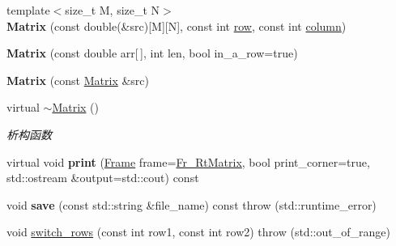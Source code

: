 \begin{DoxyCompactItemize}
\item 
\mbox{\label{classkerbal_1_1math_1_1_matrix_a39f2605c9bd2a647f6f8a7b9dfff804a}} 
{\footnotesize template$<$size\+\_\+t M, size\+\_\+t N$>$ }\\{\bfseries Matrix} (const double(\&src)\mbox{[}M\mbox{]}\mbox{[}N\mbox{]}, const int \hyperlink{classarray__2d_1_1_array__2d_a17b90b53a8e0002452e96c2b7f74820b}{row}, const int \hyperlink{classarray__2d_1_1_array__2d_abdf56a1c0f22088353d9a32de9680d76}{column})
\item 
\mbox{\label{classkerbal_1_1math_1_1_matrix_a2b2a8ad8af3e4738dc69a18e5b298577}} 
{\bfseries Matrix} (const double arr\mbox{[}$\,$\mbox{]}, int len, bool in\+\_\+a\+\_\+row=true)
\item 
\mbox{\label{classkerbal_1_1math_1_1_matrix_aae1f76133d4309d19cf020d413398d19}} 
{\bfseries Matrix} (const \hyperlink{classkerbal_1_1math_1_1_matrix}{Matrix} \&src)
\item 
\mbox{\label{classkerbal_1_1math_1_1_matrix_a444d0dcc6f6c0457b8ee3d9c095320ae}} 
virtual \hyperlink{classkerbal_1_1math_1_1_matrix_a444d0dcc6f6c0457b8ee3d9c095320ae}{$\sim$\+Matrix} ()
\begin{DoxyCompactList}\small\item\em 析构函数 \end{DoxyCompactList}\item 
\mbox{\label{classkerbal_1_1math_1_1_matrix_a80ea4536d92e0751092997062faaa445}} 
virtual void {\bfseries print} (\hyperlink{classkerbal_1_1math_1_1_matrix_a00dd9ef9c8b8c06f50eed7681f147f71}{Frame} frame=\hyperlink{classkerbal_1_1math_1_1_matrix_a00dd9ef9c8b8c06f50eed7681f147f71a2ef25fdcf6ef827bf880416bbccb0122}{Fr\+\_\+\+Rt\+Matrix}, bool print\+\_\+corner=true, std\+::ostream \&output=std\+::cout) const
\item 
\mbox{\label{classkerbal_1_1math_1_1_matrix_a0426bb22fd2d5e87b714c03c1a3c8aa4}} 
void {\bfseries save} (const std\+::string \&file\+\_\+name) const  throw (std\+::runtime\+\_\+error)
\item 
void \hyperlink{classkerbal_1_1math_1_1_matrix_a07d1c06f2a123d7a7366c49c8c884f03}{switch\+\_\+rows} (const int row1, const int row2)  throw (std\+::out\+\_\+of\+\_\+range)

\end{DoxyCompactItemize}
